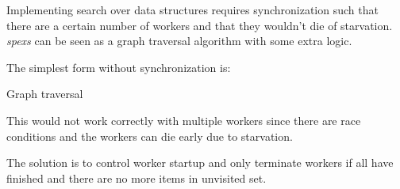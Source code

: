 
Implementing search over data structures requires synchronization such that there are a certain number of workers and that they wouldn't die of starvation. \emph{spexs} can be seen as a graph traversal algorithm with some extra logic.

The simplest form without synchronization is:

\begin{algorithm}[H]
    \caption{Graph traversal}
\begin{algorithmic}[1]


    
    \Spawn
                \EndIf
            \EndFor
        \EndWhile
    \EndSpawn

\end{algorithmic}
\end{algorithm}

This would not work correctly with multiple workers since there are race conditions and the workers can die early due to starvation.

The solution is to control worker startup and only terminate workers if all have finished and there are no more items in unvisited set.

